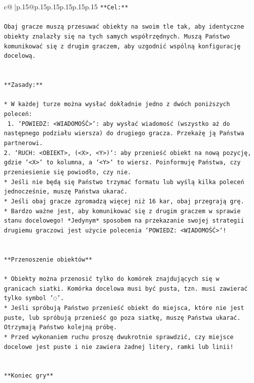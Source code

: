 \documentclass{article}
\begin{document}
{\begin{supertabular}{c@{$\;$}|p{.15\linewidth}@{}p{.15\linewidth}p{.15\linewidth}p{.15\linewidth}p{.15\linewidth}p{.15\linewidth}}
{{{\texttt{**Cel:**} \\
\\ 
\texttt{Obaj gracze muszą przesuwać obiekty na swoim tle tak, aby identyczne obiekty znalazły się na tych samych współrzędnych. Muszą Państwo komunikować się z drugim graczem, aby uzgodnić wspólną konfigurację docelową.} \\
\\ 
\\ 
\texttt{**Zasady:**} \\
\\ 
\texttt{* W każdej turze można wysłać dokładnie jedno z dwóch poniższych poleceń:} \\
\texttt{ 1. `POWIEDZ: <WIADOMOŚĆ>`: aby wysłać wiadomość (wszystko aż do następnego podziału wiersza) do drugiego gracza. Przekażę ją Państwa partnerowi.} \\
\texttt{2. `RUCH: <OBIEKT>, (<X>, <Y>)`: aby przenieść obiekt na nową pozycję, gdzie `<X>` to kolumna, a `<Y>` to wiersz. Poinformuję Państwa, czy przeniesienie się powiodło, czy nie.} \\
\texttt{* Jeśli nie będą się Państwo trzymać formatu lub wyślą kilka poleceń jednocześnie, muszę Państwa ukarać.} \\
\texttt{* Jeśli obaj gracze zgromadzą więcej niż 16 kar, obaj przegrają grę.} \\
\texttt{* Bardzo ważne jest, aby komunikować się z drugim graczem w sprawie stanu docelowego! *Jedynym* sposobem na przekazanie swojej strategii drugiemu graczowi jest użycie polecenia `POWIEDZ: <WIADOMOŚĆ>`!} \\
\\ 
\\ 
\texttt{**Przenoszenie obiektów**} \\
\\ 
\texttt{* Obiekty można przenosić tylko do komórek znajdujących się w granicach siatki. Komórka docelowa musi być pusta, tzn. musi zawierać tylko symbol '◌'.} \\
\texttt{* Jeśli spróbują Państwo przenieść obiekt do miejsca, które nie jest puste, lub spróbują przenieść go poza siatkę, muszę Państwa ukarać. Otrzymają Państwo kolejną próbę.} \\
\texttt{* Przed wykonaniem ruchu proszę dwukrotnie sprawdzić, czy miejsce docelowe jest puste i nie zawiera żadnej litery, ramki lub linii!} \\
\\ 
\\ 
\texttt{**Koniec gry**} \\
}}}
\end{supertabular}}
\end{document}
